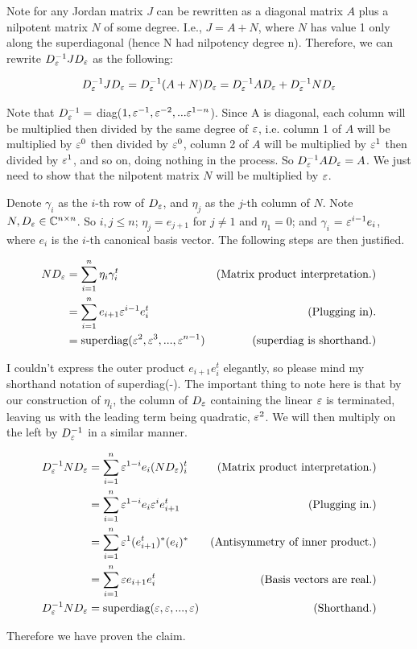 \begin{solution}
Note for any Jordan matrix $J$ can be rewritten as a diagonal matrix $A$ plus a nilpotent matrix $N$ of some degree. I.e., $J = A + N$, where $N$ has value 1 only along the superdiagonal (hence N had nilpotency degree n). Therefore, we can rewrite $D^{-1}_\varepsilon J D_\varepsilon$ as the following:

\jump
\[
D^{-1}_\varepsilon J D_\varepsilon = D^{-1}_\varepsilon (A + N) D_\varepsilon = D^{-1}_\varepsilon A D_\varepsilon + D^{-1}_\varepsilon N D_\varepsilon
\]
\jump

Note that $D_\varepsilon^{-1} = $ diag($ 1, \varepsilon^{-1}, \varepsilon^{-2}, ... \varepsilon^{1 - n}$). Since A is diagonal, each column will be multiplied then divided by the same degree of $\varepsilon$, i.e. column 1 of $A$ will be multiplied by $\varepsilon^0$ then divided by $\varepsilon^0$, column 2 of $A$ will be multiplied by $\varepsilon^1$ then divided by $\varepsilon^1$, and so on, doing nothing in the process. So $D^{-1}_\varepsilon A D_\varepsilon = A$. We just need to show that the nilpotent matrix $N$ will be multiplied by $\varepsilon$.

\jump
Denote $\gamma_i$ as the $i$-th row of $D_\varepsilon$, and $\eta_j$ as the $j$-th column of $N$. Note $N, D_\varepsilon \in \mathbb{C}^{n\times n}$. So $i,j \leq n$; $\eta_j = e_{j + 1}$ for $j \neq 1$ and $\eta_1 = 0$; and $\gamma_i$ = $\varepsilon^{i -1}e_i$, where $e_i$ is the $i$-th canonical basis vector. The following steps are then justified.

\alignbreak
\begin{align}
    ND_\varepsilon &= \sum_{i = 1}^n \eta_i\gamma_i^t &\text{(Matrix product interpretation.)}\nonumber\\
    &= \sum_{i = 1}^n e_{i + 1}\varepsilon^{i - 1}e_i^t &\text{(Plugging in).}\nonumber\\
    &= \text{superdiag}(\varepsilon^2, \varepsilon^3, ..., \varepsilon^{n - 1}) &\text{(superdiag is shorthand.)}\nonumber
\end{align}
\alignbreak

I couldn't express the outer product $e_{i + 1}e_i^t$ elegantly, so please mind my shorthand notation of superdiag(-). The important thing to note here is that by our construction of $\eta_i$, the column of $D_\varepsilon$ containing the linear $\varepsilon$ is terminated, leaving us with the leading term being quadratic, $\varepsilon^2$. We will then multiply on the left by $D_\varepsilon^{-1}$ in a similar manner.

\newpage
\alignbreak
\begin{align}
    D^{-1}_\varepsilon ND_\varepsilon &= \sum_{i = 1}^n \varepsilon^{1-i}e_i(ND_\varepsilon)_i^t &\text{(Matrix product interpretation.)}\nonumber\\   
    &= \sum_{i = 1}^n \varepsilon^{1-i}e_i\varepsilon^ie_{i + 1}^t &\text{(Plugging in.)}\nonumber\\
    &= \sum_{i = 1}^n \varepsilon^{1}(e_{i+1}^t)^*(e_i)^* &\text{(Antisymmetry of inner product.)}\nonumber\\
    &= \sum_{i = 1}^n \varepsilon e_{i+1}e_i^t &\text{(Basis vectors are real.)}\nonumber\\
    D^{-1}_\varepsilon ND_\varepsilon &= \text{superdiag}(\varepsilon, \varepsilon, ..., \varepsilon) &\text{(Shorthand.)}\nonumber
\end{align}
\alignbreak

Therefore we have proven the claim. 
\end{solution}

